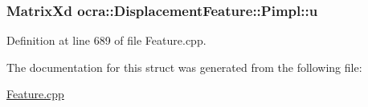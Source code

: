\subsubsection[{\texorpdfstring{u}{u}}]{\setlength{\rightskip}{0pt plus 5cm}Matrix\+Xd ocra\+::\+Displacement\+Feature\+::\+Pimpl\+::u}\hypertarget{structocra_1_1DisplacementFeature_1_1Pimpl_a7ee31c021de6d56a80cfe6bebac34af1}{}\label{structocra_1_1DisplacementFeature_1_1Pimpl_a7ee31c021de6d56a80cfe6bebac34af1}


Definition at line 689 of file Feature.\+cpp.



The documentation for this struct was generated from the following file\+:\begin{DoxyCompactItemize}
\item 
\hyperlink{Feature_8cpp}{Feature.\+cpp}\end{DoxyCompactItemize}
